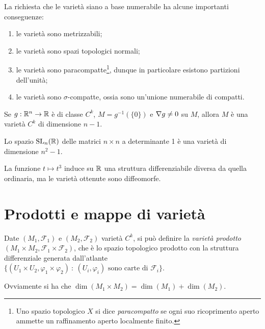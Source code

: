  \begin{remark}
  La richiesta che le varietà siano a base numerabile ha alcune importanti conseguenze:
  \begin{enumerate}
   \item le varietà sono metrizzabili;
   \item le varietà sono spazi topologici normali; %
   \item le varietà sono paracompatte\footnote{Uno spazio topologico $X$ si dice \emph{paracompatto} se ogni suo ricoprimento aperto ammette un raffinamento aperto localmente finito.}, dunque in particolare esistono partizioni dell'unità; 
   \item le varietà sono $\sigma$-compatte, ossia sono un'unione numerabile di compatti.
  \end{enumerate}
 \end{remark}

\begin{exercise}
	Se $g:\mathbb R^n\to\mathbb R$ è di classe $C^k$, $M=g^{-1}(\{0\})$ e $\nabla g\ne 0$ su $M$, allora $M$ è una varietà $C^k$ di dimensione $n-1$.
\end{exercise}
\begin{exercise}
	Lo spazio $\mathrm{SL}_n(\mathbb R)$ delle matrici $n\times n$ a determinante 1 è una varietà di dimensione $n^2-1$.
\end{exercise}
\begin{exercise}
	La funzione $t\mapsto t^3$ induce su $\mathbb R$ una struttura differenziabile diversa da quella ordinaria, ma le varietà ottenute sono diffeomorfe.
\end{exercise}
 
 \section{Prodotti e mappe di varietà}
 
\begin{definition} 
	Date $(M_1,\mathcal F_1)$ e $(M_2,\mathcal F_2)$ varietà $C^k$, si può definire la \emph{varietà prodotto} $(M_1\times M_2,\mathcal F_1\times\mathcal F_2)$, che è lo spazio topologico prodotto con la struttura differenziale generata dall'atlante $\{(U_1\times U_2,\varphi_1\times\varphi_2)\ :\ \text{$(U_i,\varphi_i)$ sono carte di $\mathcal F_i$}\}$.
\end{definition}

\begin{remark}
	Ovviamente si ha che $\dim(M_1\times M_2)=\dim(M_1)+\dim(M_2)$.
\end{remark}


